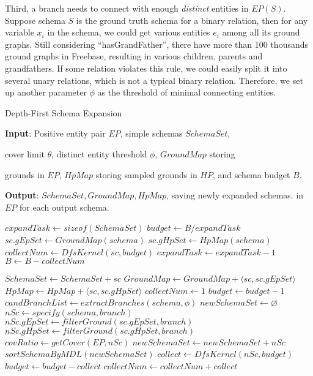 Third, a branch needs to connect with enough \textit{distinct} entities in $EP(S)$.
Suppose schema $S$ is the ground truth schema for a binary relation,
then for any variable $x_i$ in the schema,
we could get various entities $e_i$ among all its ground graphs.
Still considering ``hasGrandFather'', there have more than 100 thousands ground graphs
in Freebase, resulting in various children, parents and grandfathers.
If some relation violates this rule, we could easily split it into several
unary relations, which is not a typical binary relation.
Therefore, we set up another parameter $\phi$ as the threshold of minimal connecting entities.

\begin{algorithm}
\caption{Depth-First Schema Expansion}
\label{alg:dfs}
\textbf{Input}: Positive entity pair $EP$, simple schemas $SchemaSet$,

cover limit $\theta$, distinct entity threshold $\phi$, $GroundMap$ storing

grounds in $EP$, $HpMap$ storing sampled grounds in $HP$, and schema budget $B$.


\textbf{Output}: $SchemaSet, GroundMap, HpMap$, saving newly expanded schemas.
in $EP$ for each output schema.
\begin{algorithmic}[1]
\State $expandTask \gets sizeof(SchemaSet)$
	\State $budget \gets B / expandTask$
	\State $sc.gEpSet \gets GroundMap(schema)$
	\State $sc.gHpSet \gets HpMap(schema)$
	\State $collectNum \gets DfsKernel(sc, budget)$
	\State $expandTask \gets expandTask - 1$
	\State $B \gets B - collectNum$
\EndFor
\Return
\EndProcedure

	\EndIf
	\State $SchemaSet \gets SchemaSet + sc$
	\State $GroundMap \gets GroundMap + \langle sc, sc.gEpSet \rangle$
	\State $HpMap \gets HpMap + \langle sc, sc.gHpSet \rangle$
	\State $collectNum \gets 1$
	\State $budget \gets budget - 1$
	\State $candBranchList \gets extractBranches(schema, \phi)$
	\State $newSchemaSet \gets \varnothing$
		\State $nSc \gets specify(schema, branch)$
		\State $nSc.gEpSet \gets filterGround(sc.gEpSet, branch)$
		\State $nSc.gHpSet \gets filterGround(sc.gHpSet, branch)$
		\State $covRatio \gets getCover(EP, nSc)$
			\State $newSchemaSet \gets newSchemaSet + nSc$
		\EndIf
	\EndFor
	\State $sortSchemaByMDL(newSchemaSet)$
		\State $collect \gets DfsKernel(nSc, budget)$
		\State $budget \gets budget - collect$
		\State $collectNum \gets collectNum + collect$
	\EndFor
{}
\EndProcedure

\end{algorithmic}
\end{algorithm}


